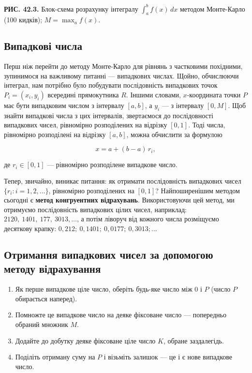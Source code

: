 \documentclass[
  ukrainian,
]{article}
\providecommand{\tightlist}{%
  \setlength{\itemsep}{0pt}\setlength{\parskip}{0pt}}
\begin{document}
\textbf{РИС. 42.3.} Блок-схема розрахунку інтегралу
\(\int_{a}^{b} f(x)\,dx\) методом Монте-Карло (100 кидків);
\(M = \max_a f(x)\).

\subsection{Випадкові
числа}\label{ux432ux438ux43fux430ux434ux43aux43eux432ux456-ux447ux438ux441ux43bux430}

Перш ніж перейти до методу Монте-Карло для рівнянь з частковими
похідними, зупинимося на важливому питанні --- випадкових числах. Щойно,
обчислюючи інтеграл, нам потрібно було побудувати послідовність
випадкових точок \(P_i = (x_i, y_i)\) всередині прямокутника \(R\).
Іншими словами, \(x\)-координата точки \(P\) має бути випадковим числом
з інтервалу \([a, b]\), а \(y_i\) --- з інтервалу \([0, M]\). Щоб знайти
випадкові числа з цих інтервалів, звертаємося до послідовності
випадкових чисел, рівномірно розподілених на відрізку \([0, 1]\). Тоді
числа, рівномірно розподілені на відрізку \([a, b]\), можна обчислити за
формулою

\[x = a + (b - a)\,r_i,\]

де \(r_i \in [0, 1]\) --- рівномірно розподілене випадкове число.

Тепер, звичайно, виникає питання: як отримати послідовність випадкових
чисел \(\{r_i: i=1,2,\ldots\}\), рівномірно розподілених на \([0,1]\)?
Найпоширенішим методом сьогодні є \textbf{метод конгруентних
відрахувань}. Використовуючи цей метод, ми отримуємо послідовність
випадкових цілих чисел, наприклад: \(2120,\ 1401,\ 177,\ 3013, \ldots\),
а потім ліворуч від кожного числа розміщуємо десяткову крапку:
\(0{,}212;\ 0{,}1401;\ 0{,}0177;\ 0{,}3013; \ldots\)

\subsection{Отримання випадкових чисел за допомогою методу
відрахування}\label{ux43eux442ux440ux438ux43cux430ux43dux43dux44f-ux432ux438ux43fux430ux434ux43aux43eux432ux438ux445-ux447ux438ux441ux435ux43b-ux437ux430-ux434ux43eux43fux43eux43cux43eux433ux43eux44e-ux43cux435ux442ux43eux434ux443-ux432ux456ux434ux440ux430ux445ux443ux432ux430ux43dux43dux44f}

\begin{enumerate}
\def\labelenumi{\arabic{enumi}.}
\tightlist
\item
  Як перше випадкове ціле число, оберіть будь-яке число між \(0\) і
  \(P\) (число \(P\) обирається наперед).
\item
  Помножте це випадкове число на деяке фіксоване число --- попередньо
  обраний множник \(M\).
\item
  Додайте до добутку деяке фіксоване ціле число \(K\), обране
  заздалегідь.
\item
  Поділіть отриману суму на \(P\) і візьміть залишок --- це і є нове
  випадкове число.
\end{enumerate}
\end{document}
